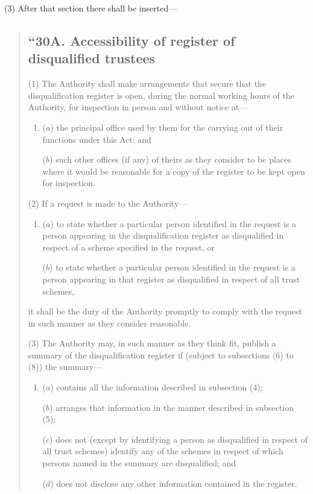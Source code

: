\documentclass[12pt,a4paper]{article}
\begin{document}
(3) After that section there shall be inserted—
\begin{quotation}
\subsection*{\sloppy “30A. Accessibility of register of disqualified trustees}

(1) The Authority shall make arrangements that secure that the disqualification register is open, during the normal working hours of the Authority, for inspection in person and without notice at—
\begin{enumerate}\item[]
($a$) the principal office used by them for the carrying out of their functions under this Act; and

($b$) such other offices (if any) of theirs as they consider to be places where it would be reasonable for a copy of the register to be kept open for inspection.
\end{enumerate}

(2) If a request is made to the Authority—
\begin{enumerate}\item[]
($a$) to state whether a particular person identified in the request is a person appearing in the disqualification register as disqualified in respect of a scheme specified in the request, or

($b$) to state whether a particular person identified in the request is a person appearing in that register as disqualified in respect of all trust schemes,
\end{enumerate}
it shall be the duty of the Authority promptly to comply with the request in such manner as they consider reasonable.

(3) The Authority may, in such manner as they think fit, publish a summary of the disqualification register if (subject to subsections (6)  to (8)) the summary—
\begin{enumerate}\item[]
($a$) contains all the information described in subsection (4);

($b$) arranges that information in the manner described in subsection (5);

($c$) does not (except by identifying a person as disqualified in respect of all trust schemes) identify any of the schemes in respect of which persons named in the summary are disqualified; and

($d$) does not disclose any other information contained in the register.
\end{enumerate}


\end{quotation}
\end{document}
